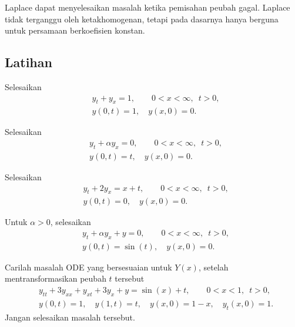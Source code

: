 Laplace dapat menyelesaikan masalah ketika pemisahan peubah gagal.
Laplace tidak terganggu oleh ketakhomogenan, tetapi pada dasarnya hanya berguna untuk
persamaan berkoefisien konstan.

\subsection{Latihan}

\begin{exercise}
Selesaikan
\begin{align*}
& y_t + y_x = 1, \qquad 0 < x < \infty, \enspace t > 0,
\\
& y(0,t) = 1, \quad y(x,0) = 0 .
\end{align*}
\end{exercise}

\begin{exercise}
Selesaikan
\begin{align*}
& y_t + \alpha y_x = 0, \qquad 0 < x < \infty, \enspace t > 0,
\\
& y(0,t) = t, \quad y(x,0) = 0 .
\end{align*}
\end{exercise}

\begin{exercise}
Selesaikan
\begin{align*}
& y_t + 2 y_x = x+t, \qquad 0 < x < \infty, \enspace t > 0,
\\
& y(0,t) = 0, \quad y(x,0) = 0 .
\end{align*}
\end{exercise}

\begin{exercise}
Untuk $\alpha > 0$, selesaikan
\begin{align*}
& y_t + \alpha y_x + y = 0, \qquad 0 < x < \infty, \enspace t > 0,
\\
& y(0,t) = \sin(t), \quad y(x,0) = 0 .
\end{align*}
\end{exercise}

\begin{exercise}
Carilah masalah ODE yang bersesuaian untuk $Y(x)$, setelah mentransformasikan peubah $t$
tersebut
\begin{align*}
& y_{tt} + 3y_{xx} + y_{xt} + 3 y_x + y = \sin(x) + t, \qquad 0 < x < 1, \enspace t > 0,
\\
& y(0,t) = 1, \quad y(1,t) =  t, \quad y(x,0) = 1-x, \quad y_t(x,0) = 1 .
\end{align*}
Jangan selesaikan masalah tersebut.
\end{exercise}

